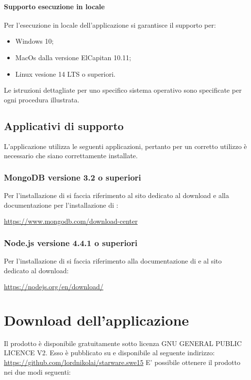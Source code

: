 \documentclass[12pt,a4paper]{article}
\begin{document}
	\paragraph{Supporto esecuzione in locale}
	Per l'esecuzione in locale  dell'applicazione si garantisce il supporto per:
		\begin{itemize}
			\item Windows 10;
			\item MacOs dalla versione ElCapitan 10.11;
			\item Linux vesione 14 LTS o superiori.
		\end{itemize}
	
	
	Le istruzioni dettagliate per uno specifico sistema operativo sono specificate per ogni procedura illustrata.
	
	\subsection{Applicativi di supporto}
	L'applicazione \prj utilizza le seguenti applicazioni, pertanto per un corretto utilizzo è necessario che siano correttamente installate.
	\subsubsection{MongoDB versione 3.2 o superiori}
	Per l'installazione di  si faccia riferimento al sito dedicato al download e alla documentazione per l'installazione di :
	\begin{center} \url{https://www.mongodb.com/download-center}
	\end{center}
	
	\subsubsection{Node.js versione 4.4.1 o superiori}
		Per l'installazione di  si faccia riferimento alla documentazione di  e al sito dedicato al download:
		\begin{center} \url{https://nodejs.org/en/download/} 
		\end{center}
	
	\section{Download dell'applicazione}\label{download}
	Il prodotto è disponibile gratuitamente sotto  licenza GNU GENERAL PUBLIC LICENCE V2. Esso è pubblicato
	su  e disponibile al seguente indirizzo: \url{https://github.com/lordnikolai/starware.swe15}
	E' possibile ottenere il prodotto nei due modi seguenti:
\end{document}
